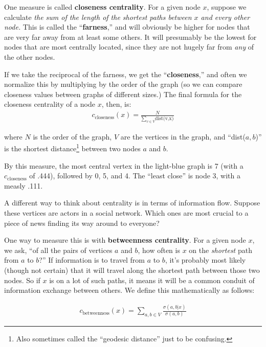 \documentclass[12pt]{article}
\begin{document}
\vspace{.2in}
One measure is called \textbf{closeness centrality}. For a given node $x$,
suppose we calculate \textit{the sum of the length of the shortest paths
between $x$ and every other node.} This is called the ``\textbf{farness},'' and
will obviously be higher for nodes that are very far away from at least some
others. It will presumably be the lowest for nodes that are most centrally
located, since they are not hugely far from \textit{any} of the other nodes.

If we take the reciprocal of the farness, we get the ``\textbf{closeness},''
and often we normalize this by multiplying by the order of the graph (so we
can compare closeness values between graphs of different sizes.) The final
formula for the closeness centrality of a node $x$, then, is:
\begin{align*}
c_{\textrm{closeness}}(x) = \frac{N}{\sum_{v \in V} \textrm{dist(v,x)}}
\end{align*}

where $N$ is the order of the graph, $V$ are the vertices in the graph, and
``dist($a,b$)'' is the shortest distance\footnote{Also sometimes called the
``geodesic distance'' just to be confusing.} between two nodes $a$ and $b$.

By this measure, the most central vertex in the light-blue graph is 7 (with a 
$c_{\textrm{closeness}}$ of .444), followed by 0, 5, and 4. The ``least
close''
is node 3, with a measly .111.

\vspace{.2in}

A different way to think about centrality is in terms of information flow.
Suppose these vertices are actors in a social network. Which ones are most
crucial to a piece of news finding its way around to everyone? 

One way to measure this is with \textbf{betweenness centrality}. For a given
node $x$, we ask, ``of all the pairs of vertices $a$ and $b$, how often is $x$
on the \textit{shortest} path from $a$ to $b$?'' If information is to travel
from $a$ to $b$, it's probably most likely (though not certain) that it will
travel along the shortest path between those two nodes. So if $x$ is on a lot
of such paths, it means it will be a common conduit of information exchange
between others. We define this mathematically as follows:

\begin{align*}
c_{\textrm{betweenness}}(x) = \sum_{a,b \in V} \frac{\sigma(a,b|x)}{\sigma(a,b)}
\end{align*}
\end{document}
